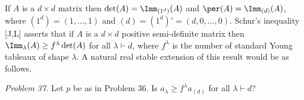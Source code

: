 If $A$ is a $d\times d$ matrix then $\det(A)=\Imm_{(1^d)}(A)$ and $\per(A)=\Imm_{(d)}(A)$, where $(1^d)=(1,\ldots,1)$ and $(d)=(1^d)'=(d,0,\ldots,0)$.  Schur's inequality [J,L] asserts that if $A$ is a $d\times d$ positive semi-definite matrix then $\Imm_\lambda(A)\ge f^\lambda\det(A)$ for all $\lambda\vdash d$, where $f^\lambda$ is the number of standard Young tableaux of shape $\lambda$.  A natural real stable extension of this result would be as follows.

\emph{Problem 37.}  Let $p$ be as in Problem 36.  Is $a_\lambda\ge f^\lambda a_{(d)}$ for all $\lambda\vdash d$?
